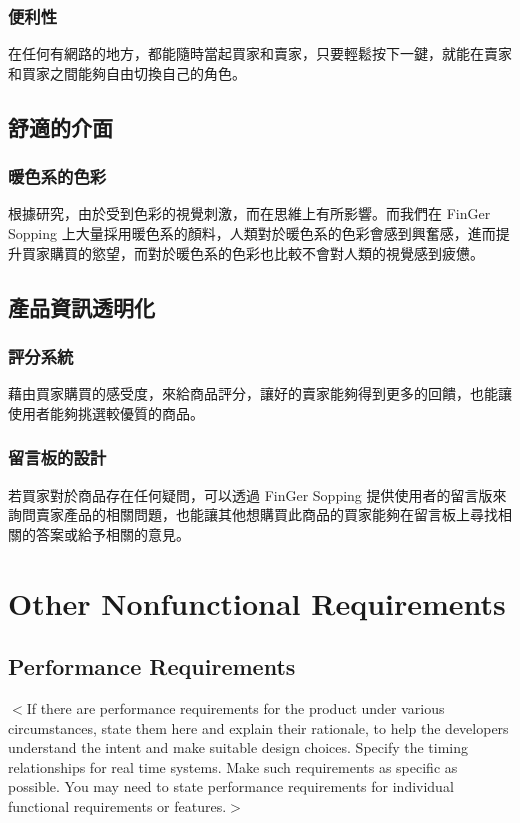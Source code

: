 \documentclass{scrreprt}
\begin{document}
\begin{CJK}{UTF8}{bkai}
\subsection{便利性}
\qquad 在任何有網路的地方，都能隨時當起買家和賣家，只要輕鬆按下一鍵，就能在賣家和買家之間能夠自由切換自己的角色。


\section{舒適的介面}

\subsection{暖色系的色彩}
\qquad 根據研究，由於受到色彩的視覺刺激，而在思維上有所影響。而我們在 FinGer Sopping 上大量採用暖色系的顏料，人類對於暖色系的色彩會感到興奮感，進而提升買家購買的慾望，而對於暖色系的色彩也比較不會對人類的視覺感到疲憊。

\section{產品資訊透明化}
\subsection{評分系統}
\qquad 藉由買家購買的感受度，來給商品評分，讓好的賣家能夠得到更多的回饋，也能讓使用者能夠挑選較優質的商品。

\subsection{留言板的設計}
\qquad 若買家對於商品存在任何疑問，可以透過 FinGer Sopping 提供使用者的留言版來詢問賣家產品的相關問題，也能讓其他想購買此商品的買家能夠在留言板上尋找相關的答案或給予相關的意見。

\chapter{Other Nonfunctional Requirements}

\section{Performance Requirements}
$<$If there are performance requirements for the product under various 
circumstances, state them here and explain their rationale, to help the 
developers understand the intent and make suitable design choices. Specify the 
timing relationships for real time systems. Make such requirements as specific 
as possible. You may need to state performance requirements for individual 
functional requirements or features.$>$


\end{CJK}
\end{document}
